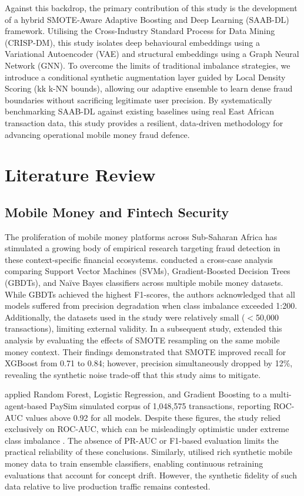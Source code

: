\documentclass[a4paper,fleqn]{cas-sc}
\begin{document}
Against this backdrop, the primary contribution of this study is the development of a hybrid SMOTE-Aware Adaptive Boosting and Deep Learning (SAAB-DL) framework. Utilising the Cross-Industry Standard Process for Data Mining (CRISP-DM), this study isolates deep behavioural embeddings using a Variational Autoencoder (VAE) and structural embeddings using a Graph Neural Network (GNN). To overcome the limits of traditional imbalance strategies, we introduce a conditional synthetic augmentation layer guided by Local Density Scoring (kk
k-NN bounds), allowing our adaptive ensemble to learn dense fraud boundaries without sacrificing legitimate user precision. By systematically benchmarking SAAB-DL against existing baselines using real East African transaction data, this study provides a resilient, data-driven methodology for advancing operational mobile money fraud defence.


\section{Literature Review}

\subsection{Mobile Money and Fintech Security}

The proliferation of mobile money platforms across Sub-Saharan Africa has stimulated a growing body of empirical research targeting fraud detection in these context-specific financial ecosystems. \cite{botchey2020mobile} conducted a cross-case analysis comparing Support Vector Machines (SVMs), Gradient-Boosted Decision Trees (GBDTs), and Na\"ive Bayes classifiers across multiple mobile money datasets. While GBDTs achieved the highest F1-scores, the authors acknowledged that all models suffered from precision degradation when class imbalance exceeded 1:200. Additionally, the datasets used in the study were relatively small ($<$50,000 transactions), limiting external validity. In a subsequent study, \cite{botchey2022predicting} extended this analysis by evaluating the effects of SMOTE resampling on the same mobile money context. Their findings demonstrated that SMOTE improved recall for XGBoost from 0.71 to 0.84; however, precision simultaneously dropped by 12\%, revealing the synthetic noise trade-off that this study aims to mitigate.

\cite{Lokanan2023predicting} applied Random Forest, Logistic Regression, and Gradient Boosting to a multi-agent-based PaySim simulated corpus of 1,048,575 transactions, reporting ROC-AUC values above 0.92 for all models. Despite these figures, the study relied exclusively on ROC-AUC, which can be misleadingly optimistic under extreme class imbalance \cite{Saito2015PrecisionRecall}. The absence of PR-AUC or F1-based evaluation limits the practical reliability of these conclusions. Similarly, \cite{Azamuke2025Financial} utilised rich synthetic mobile money data to train ensemble classifiers, enabling continuous retraining evaluations that account for concept drift. However, the synthetic fidelity of such data relative to live production traffic remains contested.
\end{document}
